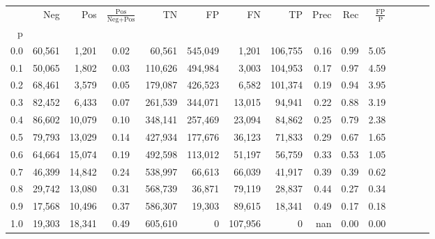 \begin{tabular}{rrrcrrrrrrrrrrr}
\toprule
{} &     Neg &     Pos & $\frac{\text{Pos}}{\text{Neg}+\text{Pos}}$ &       TN &       FP &       FN &       TP &  Prec &   Rec & $\frac{\text{FP}}{\text{P}}$ \\
p   &         &         &                                            &          &          &          &          &       &       &                              \\
\midrule
0.0 &  60,561 &   1,201 &                                       0.02 &   60,561 &  545,049 &    1,201 &  106,755 &  0.16 &  0.99 &                         5.05 \\
0.1 &  50,065 &   1,802 &                                       0.03 &  110,626 &  494,984 &    3,003 &  104,953 &  0.17 &  0.97 &                         4.59 \\
0.2 &  68,461 &   3,579 &                                       0.05 &  179,087 &  426,523 &    6,582 &  101,374 &  0.19 &  0.94 &                         3.95 \\
0.3 &  82,452 &   6,433 &                                       0.07 &  261,539 &  344,071 &   13,015 &   94,941 &  0.22 &  0.88 &                         3.19 \\
0.4 &  86,602 &  10,079 &                                       0.10 &  348,141 &  257,469 &   23,094 &   84,862 &  0.25 &  0.79 &                         2.38 \\
0.5 &  79,793 &  13,029 &                                       0.14 &  427,934 &  177,676 &   36,123 &   71,833 &  0.29 &  0.67 &                         1.65 \\
0.6 &  64,664 &  15,074 &                                       0.19 &  492,598 &  113,012 &   51,197 &   56,759 &  0.33 &  0.53 &                         1.05 \\
0.7 &  46,399 &  14,842 &                                       0.24 &  538,997 &   66,613 &   66,039 &   41,917 &  0.39 &  0.39 &                         0.62 \\
0.8 &  29,742 &  13,080 &                                       0.31 &  568,739 &   36,871 &   79,119 &   28,837 &  0.44 &  0.27 &                         0.34 \\
0.9 &  17,568 &  10,496 &                                       0.37 &  586,307 &   19,303 &   89,615 &   18,341 &  0.49 &  0.17 &                         0.18 \\
1.0 &  19,303 &  18,341 &                                       0.49 &  605,610 &        0 &  107,956 &        0 &   nan &  0.00 &                         0.00 \\
\bottomrule
\end{tabular}
